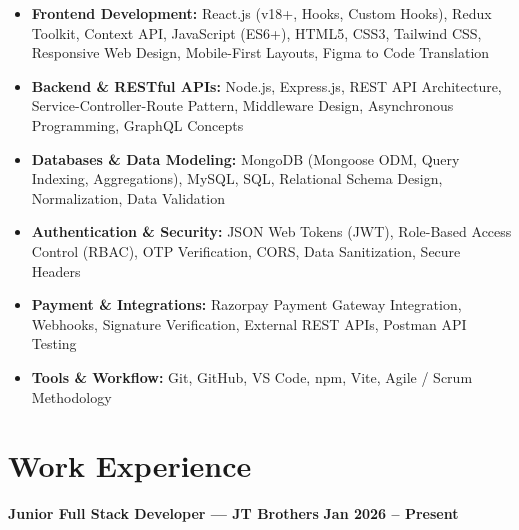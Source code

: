 \documentclass[a4paper,10pt]{article}
\begin{document}
\begin{itemize}

    \item \textbf{Frontend Development:}
    React.js (v18+, Hooks, Custom Hooks), Redux Toolkit, Context API,
    JavaScript (ES6+), HTML5, CSS3, Tailwind CSS, Responsive Web Design,
    Mobile-First Layouts, Figma to Code Translation

    \item \textbf{Backend \& RESTful APIs:}
    Node.js, Express.js, REST API Architecture, Service-Controller-Route Pattern,
    Middleware Design, Asynchronous Programming, GraphQL Concepts

    \item \textbf{Databases \& Data Modeling:}
    MongoDB (Mongoose ODM, Query Indexing, Aggregations), MySQL, SQL,
    Relational Schema Design, Normalization, Data Validation

    \item \textbf{Authentication \& Security:}
    JSON Web Tokens (JWT), Role-Based Access Control (RBAC),
    OTP Verification, CORS, Data Sanitization, Secure Headers

    \item \textbf{Payment \& Integrations:}
    Razorpay Payment Gateway Integration, Webhooks, Signature Verification,
    External REST APIs, Postman API Testing

    \item \textbf{Tools \& Workflow:}
    Git, GitHub, VS Code, npm, Vite, Agile / Scrum Methodology

\end{itemize}

\section*{Work Experience}

\textbf{Junior Full Stack Developer --- JT Brothers}
\hfill
\textbf{Jan 2026 -- Present}
\end{document}
